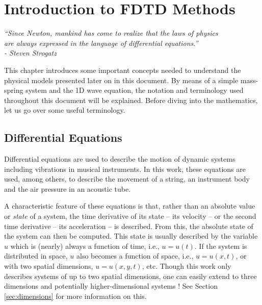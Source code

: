 \chapter{Introduction to FDTD Methods}\label{ch:FDTD}

\begin{flushright}{\it
``Since Newton, mankind has come to realize that the laws of physics\\
are always expressed in the language of differential equations.''\\
- Steven Strogatz} %
\end{flushright}
%
\vspace{2em}
This chapter introduces some important concepts needed to understand the physical models presented later on in this document. 
By means of a simple mass-spring system and the 1D wave equation, the notation and terminology used throughout this document will be explained. 
Before diving into the mathematics, let us go over some useful terminology.

\section{Differential Equations}
Differential equations are used to describe the motion of dynamic systems including vibrations in musical instruments. In this work, these equations are used, among others, to describe the movement of a string, an instrument body and the air pressure in an acoustic tube.

A characteristic feature of these equations is that, rather than an absolute value or \textit{state} of a system, the time derivative of its state -- its velocity -- or the second time derivative -- its acceleration -- is described. From this, the absolute state of the system can then be computed.
%
This state is usually described by the variable $u$ which is (nearly) always a function of time, i.e., $u=u(t)$. If the system is distributed in space, $u$ also becomes a function of space, i.e., $u = u(x,t)$, or with two spatial dimensions, $u = u(x,y,t)$, etc. Though this work only describes systems of up to two spatial dimensions, one can easily extend to three dimensions \cite{Hamilton2016} and potentially higher-dimensional systems \cite{Bustamante2017}! See Section \ref{sec:dimensions} for more information on this.

